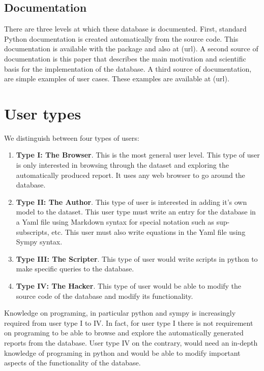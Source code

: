 \documentclass[11pt,a4paper]{article}
\begin{document}
\subsection{Documentation}
There are three levels at which these database is documented. First, standard Python documentation is created automatically from the source code. This documentation is available with the package and also at (url). A second source of documentation is this paper that describes the main motivation and scientific basis for the implementation of the database. A third source of documentation, are simple examples of user cases. These examples are available at (url).


\section{User types}

We distinguish between four types of users:

\begin{enumerate}
\item {\bf Type I: The Browser}. This is the most general user level. This type of user is only interested in browsing through the dataset and exploring the automatically produced report. It uses any web browser to go around the database.
\item {\bf Type II: The Author}. This type of user is interested in adding it's own model to the dataset. This user type must write an entry for the database in a Yaml file using Markdown syntax for special notation such as sup- subscripts, etc. This user must also write equations in the Yaml file using Sympy syntax. 
\item {\bf Type III: The Scripter}. This type of user would write scripts in python to make specific queries to the database. 
\item {\bf Type IV: The Hacker}. This type of user would be able to modify the source code of the database and modify its functionality. 
\end{enumerate}

Knowledge on programing, in particular python and sympy is increasingly required from user type I to IV. In fact, for user type I there is not requirement on programing to be able to browse and explore the automatically generated reports from the database. User type IV on the contrary, would need an in-depth knowledge of programing in python and would be able to modify important aspects of the functionality of the database. 



\end{document}
